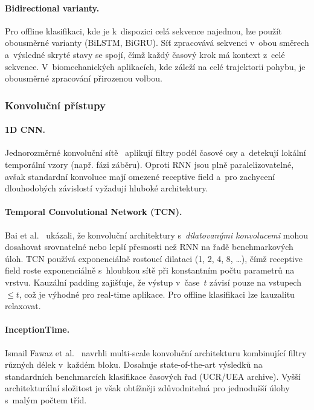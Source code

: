 \paragraph{Bidirectional varianty.}
Pro offline klasifikaci, kde je k~dispozici celá sekvence najednou, lze použít obousměrné varianty (BiLSTM, BiGRU). Síť zpracovává sekvenci v~obou směrech a~výsledné skryté stavy se spojí, čímž každý časový krok má kontext z~celé sekvence. V~biomechanických aplikacích, kde záleží na celé trajektorii pohybu, je obousměrné zpracování přirozenou volbou.

\subsubsection{Konvoluční přístupy}
\label{subsubsec:konvolucni}

\paragraph{1D CNN.}
Jednorozměrné konvoluční sítě~\cite{kiranyaz2021_1dcnn} aplikují filtry podél časové osy a~detekují lokální temporální vzory (např. fázi záběru). Oproti RNN jsou plně paralelizovatelné, avšak standardní konvoluce mají omezené receptive field a~pro zachycení dlouhodobých závislostí vyžadují hluboké architektury.

\paragraph{Temporal Convolutional Network (TCN).}
Bai et al.~\cite{bai2018tcn} ukázali, že konvoluční architektury s~\emph{dilatovanými konvolucemi} mohou dosahovat srovnatelné nebo lepší přesnosti než RNN na řadě benchmarkových úloh. TCN používá exponenciálně rostoucí dilataci (1, 2, 4, 8, \ldots), čímž receptive field roste exponenciálně s~hloubkou sítě při konstantním počtu parametrů na vrstvu. Kauzální padding zajišťuje, že výstup v~čase~$t$ závisí pouze na vstupech $\leq t$, což je výhodné pro real-time aplikace. Pro offline klasifikaci lze kauzalitu relaxovat.

\paragraph{InceptionTime.}
Ismail Fawaz et al.~\cite{ismailfawaz2020inceptiontime} navrhli multi-scale konvoluční architekturu kombinující filtry různých délek v~každém bloku. Dosahuje state-of-the-art výsledků na standardních benchmarcích klasifikace časových řad (UCR/UEA archive). Vyšší architekturální složitost je však obtížněji zdůvodnitelná pro jednodušší úlohy s~malým počtem tříd.

